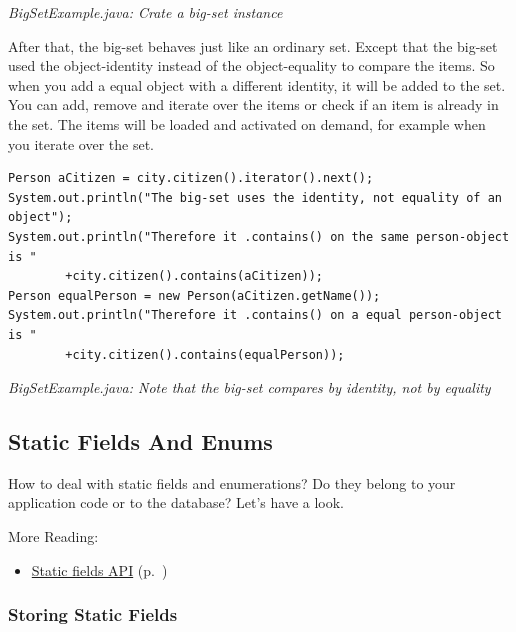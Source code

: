 {\small\itshape BigSetExample.java: Crate a big-set instance\par}
\medskip

After that, the big-set behaves just like an ordinary set. Except that the big-set used the object-identity instead of the object-equality to compare the items. So when you add a equal object with a different identity, it will be added to the set. You can add, remove and iterate over the items or check if an item is already in the set. The items will be loaded and activated on demand, for example when you iterate over the set.

\begin{lstlisting}
Person aCitizen = city.citizen().iterator().next();
System.out.println("The big-set uses the identity, not equality of an object");
System.out.println("Therefore it .contains() on the same person-object is "
        +city.citizen().contains(aCitizen));
Person equalPerson = new Person(aCitizen.getName());
System.out.println("Therefore it .contains() on a equal person-object is "
        +city.citizen().contains(equalPerson));
\end{lstlisting}

{\small\itshape BigSetExample.java: Note that the big-set compares by identity, not by equality\par}
\medskip

\subsection{Static Fields And Enums}
\label{ref:advanced-topics-type-handling-static-fields-and-enums}

How to deal with static fields and enumerations? Do they belong to your application code or to the database? Let's have a look.

More Reading:

\begin{itemize}
\item \hyperref[ref:advanced-topics-type-handling-static-fields-and-enums-static-fields-api]{Static fields API} (p.~\pageref{ref:advanced-topics-type-handling-static-fields-and-enums-static-fields-api})
\end{itemize}

\subsubsection{Storing Static Fields}
\label{ref:advanced-topics-type-handling-static-fields-and-enums-static-fields-api}

